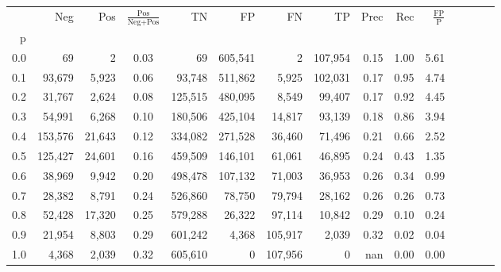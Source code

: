 \begin{tabular}{rrrcrrrrrrrrrrr}
\toprule
{} &      Neg &     Pos & $\frac{\text{Pos}}{\text{Neg}+\text{Pos}}$ &       TN &       FP &       FN &       TP &  Prec &   Rec & $\frac{\text{FP}}{\text{P}}$ \\
p   &          &         &                                            &          &          &          &          &       &       &                              \\
\midrule
0.0 &       69 &       2 &                                       0.03 &       69 &  605,541 &        2 &  107,954 &  0.15 &  1.00 &                         5.61 \\
0.1 &   93,679 &   5,923 &                                       0.06 &   93,748 &  511,862 &    5,925 &  102,031 &  0.17 &  0.95 &                         4.74 \\
0.2 &   31,767 &   2,624 &                                       0.08 &  125,515 &  480,095 &    8,549 &   99,407 &  0.17 &  0.92 &                         4.45 \\
0.3 &   54,991 &   6,268 &                                       0.10 &  180,506 &  425,104 &   14,817 &   93,139 &  0.18 &  0.86 &                         3.94 \\
0.4 &  153,576 &  21,643 &                                       0.12 &  334,082 &  271,528 &   36,460 &   71,496 &  0.21 &  0.66 &                         2.52 \\
0.5 &  125,427 &  24,601 &                                       0.16 &  459,509 &  146,101 &   61,061 &   46,895 &  0.24 &  0.43 &                         1.35 \\
0.6 &   38,969 &   9,942 &                                       0.20 &  498,478 &  107,132 &   71,003 &   36,953 &  0.26 &  0.34 &                         0.99 \\
0.7 &   28,382 &   8,791 &                                       0.24 &  526,860 &   78,750 &   79,794 &   28,162 &  0.26 &  0.26 &                         0.73 \\
0.8 &   52,428 &  17,320 &                                       0.25 &  579,288 &   26,322 &   97,114 &   10,842 &  0.29 &  0.10 &                         0.24 \\
0.9 &   21,954 &   8,803 &                                       0.29 &  601,242 &    4,368 &  105,917 &    2,039 &  0.32 &  0.02 &                         0.04 \\
1.0 &    4,368 &   2,039 &                                       0.32 &  605,610 &        0 &  107,956 &        0 &   nan &  0.00 &                         0.00 \\
\bottomrule
\end{tabular}
